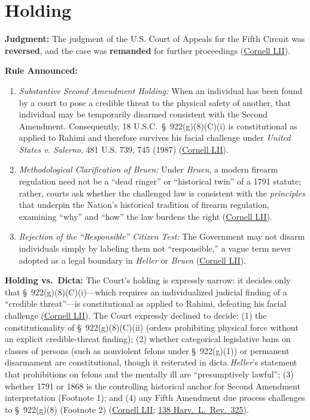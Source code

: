 \documentclass[12pt]{article}
\begin{document}
\section{Holding}

\textbf{Judgment:} The judgment of the U.S. Court of Appeals for the Fifth Circuit was \textbf{reversed}, and the case was \textbf{remanded} for further proceedings (\href{https://www.law.cornell.edu/supremecourt/text/22-915}{Cornell LII}).

\textbf{Rule Announced:}
\begin{enumerate}
\item \textit{Substantive Second Amendment Holding:} When an individual has been found by a court to pose a credible threat to the physical safety of another, that individual may be temporarily disarmed consistent with the Second Amendment. Consequently, 18 U.S.C.\ \S\ 922(g)(8)(C)(i) is constitutional as applied to Rahimi and therefore survives his facial challenge under \textit{United States v. Salerno}, 481 U.S. 739, 745 (1987) (\href{https://www.law.cornell.edu/supremecourt/text/22-915}{Cornell LII}).
\item \textit{Methodological Clarification of Bruen:} Under \textit{Bruen}, a modern firearm regulation need not be a ``dead ringer'' or ``historical twin'' of a 1791 statute; rather, courts ask whether the challenged law is consistent with the \textit{principles} that underpin the Nation's historical tradition of firearm regulation, examining ``why'' and ``how'' the law burdens the right (\href{https://www.law.cornell.edu/supremecourt/text/22-915}{Cornell LII}).
\item \textit{Rejection of the ``Responsible'' Citizen Test:} The Government may not disarm individuals simply by labeling them not ``responsible,'' a vague term never adopted as a legal boundary in \textit{Heller} or \textit{Bruen} (\href{https://www.law.cornell.edu/supremecourt/text/22-915}{Cornell LII}).
\end{enumerate}

\textbf{Holding vs.\ Dicta:} The Court's holding is expressly narrow: it decides only that \S\ 922(g)(8)(C)(i)---which requires an individualized judicial finding of a ``credible threat''---is constitutional as applied to Rahimi, defeating his facial challenge (\href{https://www.law.cornell.edu/supremecourt/text/22-915}{Cornell LII}). The Court expressly declined to decide: (1) the constitutionality of \S\ 922(g)(8)(C)(ii) (orders prohibiting physical force without an explicit credible-threat finding); (2) whether categorical legislative bans on classes of persons (such as nonviolent felons under \S\ 922(g)(1)) or permanent disarmament are constitutional, though it reiterated in dicta \textit{Heller}'s statement that prohibitions on felons and the mentally ill are ``presumptively lawful''; (3) whether 1791 or 1868 is the controlling historical anchor for Second Amendment interpretation (Footnote 1); and (4) any Fifth Amendment due process challenges to \S\ 922(g)(8) (Footnote 2) (\href{https://www.law.cornell.edu/supremecourt/text/22-915}{Cornell LII}; \href{https://harvardlawreview.org/print/vol-138/united-states-v-rahimi/}{138 Harv.\ L.\ Rev.\ 325}).
\end{document}
